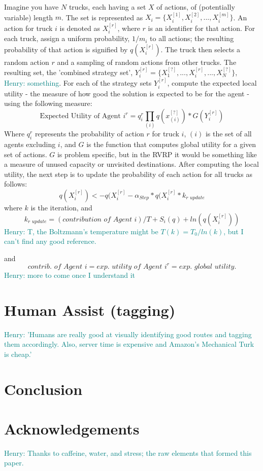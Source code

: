 \documentclass{sig-alternate}
\newcommand{\allcomments}[1]{{#1}}
\newcommand{\hfcomment}[1]{\textcolor{Teal}{\allcomments{Henry: {#1}}}}
\begin{document}
	Imagine you have $N$ trucks, each having a set $X$ of actions, of (potentially variable) length $m$. The set is represented as $X_i=\{X_i^{[1]}, X_i^{[2]}, ..., X_i^{[m]}\}$. An action for truck $i$ is denoted as $X_i^{[r]}$, where $r$ is an identifier for that action. For each truck, assign a uniform probability, $1/m_i$ to all actions; the resulting probability of that action is signified by $q(X_i^{[r]})$. The truck then selects a random action $r$ and a sampling of random actions from other trucks. The resulting set, the 'combined strategy set', $Y_i^{[r]}=\{X_1^{[?]}, ...,X_i^{[r]}, ...,X_N^{[?]}\}$, \hfcomment{something}. For each of the strategy sets $Y_i^{[r]}$, compute the expected local utility - the measure of how good the solution is expected to be for the agent - using the following measure:
	\begin{equation}
	\textrm{Expected Utility of Agent } i^r =q_i^r\prod_{(i)}{q(x_{(i)}^{[?]})*G(Y_i^{[r]})}
	\end{equation}
Where $q_i^r$ represents the probability of action $r$ for truck $i$, $(i)$ is the set of all agents excluding $i$, and $G$ is the function that computes global utility for a given set of actions. $G$ is problem specific, but in the RVRP it would be something like a measure of unused capacity or unvisited destinations. After computing the local utility, the next step is to update the probability of each action for all trucks as follows:
	\begin{equation}
	q(X_i^{[r]})<-q(X_i^{[r]}-\alpha_{Step}*q(X_i^{[r]}*k_{\textit{r update}}
	\end{equation}
where $k$ is the iteration, and
	\begin{equation}
	k_{\textit{r update}} = (\textit{contribution of Agent }i)/T+S_i(q)+ln(q(X_i^{[r]}))
	\end{equation}
\hfcomment{T, the Boltzmann's temperature might be $T(k)=T_0/ln(k)$, but I can't find any good reference.}

and
	\begin{equation}
	\textit{contrib. of Agent }i = \textit{exp. utility of  Agent }i^r = \textit{exp. global utility}.
	\end{equation}	
\hfcomment{more to come once I understand it}


\section{Human Assist (tagging)}
\label{sec:humans}
\hfcomment{'Humans are really good at visually identifying good routes and tagging them accordingly. Also, server time is expensive and Amazon's Mechanical Turk is cheap.'}

\section{Conclusion}
\label{conclusion}

\section{Acknowledgements}
\hfcomment{Thanks to caffeine, water, and stress; the raw elements that formed this paper.}

  
\end{document}
